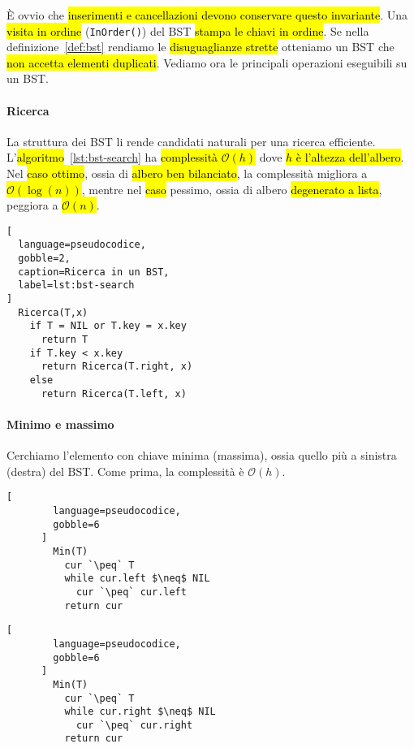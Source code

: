 \documentclass[a4paper,11pt,oneside]{article}
\theoremstyle{plain}
\theoremstyle{definition}
\theoremstyle{remark}
\newcommand{\peq}{$\gets$}
\begin{document}
È ovvio che \hl{inserimenti e cancellazioni devono conservare questo invariante}.
Una \hl{visita in ordine} (\texttt{InOrder()}) del BST \hl{stampa le chiavi in ordine}.
Se nella definizione~\ref{def:bst} rendiamo le \hl{disuguaglianze strette} otteniamo
un BST che \hl{non accetta elementi duplicati}. Vediamo ora le principali operazioni
eseguibili su un BST.

\paragraph{Ricerca} La struttura dei BST li rende candidati naturali per una
ricerca efficiente. L'\hl{algoritmo}~\ref{lst:bst-search} ha \hl{complessità
$\mathcal{O}(h)$} dove \hl{$h$ è l'altezza dell'albero}. Nel \hl{caso ottimo},
ossia di \hl{albero ben bilanciato}, la complessità migliora a
\hl{$\mathcal{O}(\log(n))$}, mentre nel \hl{caso} pessimo, ossia di albero
\hl{degenerato a lista}, peggiora a \hl{$\mathcal{O}(n)$}.

\begin{lstlisting}[
  language=pseudocodice,
  gobble=2,
  caption=Ricerca in un BST,
  label=lst:bst-search
]
  Ricerca(T,x)
    if T = NIL or T.key = x.key
      return T
    if T.key < x.key
      return Ricerca(T.right, x)
    else
      return Ricerca(T.left, x)
\end{lstlisting}

\paragraph{Minimo e massimo} Cerchiamo l'elemento con chiave minima (massima),
ossia quello più a sinistra (destra) del BST. Come prima, la complessità è
$\mathcal{O}(h)$.

\noindent\begin{minipage}{\linewidth}
  \centering
  \begin{minipage}{0.45\linewidth}
    \centering
    \begin{lstlisting}[
        language=pseudocodice,
        gobble=6
      ]
        Min(T)
          cur `\peq` T
          while cur.left $\neq$ NIL
            cur `\peq` cur.left
          return cur
    \end{lstlisting}
  \end{minipage}
  \begin{minipage}{0.45\linewidth}
    \centering
    \begin{lstlisting}[
        language=pseudocodice,
        gobble=6
      ]
        Min(T)
          cur `\peq` T
          while cur.right $\neq$ NIL
            cur `\peq` cur.right
          return cur
    \end{lstlisting}
  \end{minipage}
\end{minipage}
\end{document}
